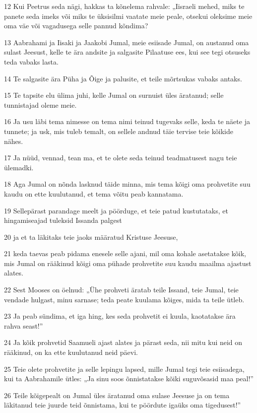 \par 12 Kui Peetrus seda nägi, hakkas ta kõnelema rahvale: „Iisraeli mehed, miks te panete seda imeks või miks te üksisilmi vaatate meie peale, otsekui oleksime meie oma väe või vagadusega selle pannud kõndima?
\par 13 Aabrahami ja Iisaki ja Jaakobi Jumal, meie esiisade Jumal, on austanud oma sulast Jeesust, kelle te ära andsite ja salgasite Pilaatuse ees, kui see tegi otsuseks teda vabaks lasta.
\par 14 Te salgasite ära Püha ja Õige ja palusite, et teile mõrtsukas vabaks antaks.
\par 15 Te tapsite elu ülima juhi, kelle Jumal on surnuist üles äratanud; selle tunnistajad oleme meie.
\par 16 Ja usu läbi tema nimesse on tema nimi teinud tugevaks selle, keda te näete ja tunnete; ja usk, mis tuleb temalt, on sellele andnud täie tervise teie kõikide nähes.
\par 17 Ja nüüd, vennad, tean ma, et te olete seda teinud teadmatusest nagu teie ülemadki.
\par 18 Aga Jumal on nõnda lasknud täide minna, mis tema kõigi oma prohvetite suu kaudu on ette kuulutanud, et tema võitu peab kannatama.
\par 19 Sellepärast parandage meelt ja pöörduge, et teie patud kustutataks, et hingamiseajad tuleksid Issanda palgest
\par 20 ja et ta läkitaks teie jaoks määratud Kristuse Jeesuse,
\par 21 keda taevas peab pidama enesele selle ajani, mil oma kohale asetatakse kõik, mis Jumal on rääkinud kõigi oma pühade prohvetite suu kaudu maailma ajastust alates.
\par 22 Sest Mooses on öelnud: „Ühe prohveti äratab teile Issand, teie Jumal, teie vendade hulgast, minu sarnase; teda peate kuulama kõiges, mida ta teile ütleb.
\par 23 Ja peab sündima, et iga hing, kes seda prohvetit ei kuula, kaotatakse ära rahva seast!”
\par 24 Ja kõik prohvetid Saamueli ajast alates ja pärast seda, nii mitu kui neid on rääkinud, on ka ette kuulutanud neid päevi.
\par 25 Teie olete prohvetite ja selle lepingu lapsed, mille Jumal tegi teie esiisadega, kui ta Aabrahamile ütles: „Ja sinu soos õnnistatakse kõiki suguvõsasid maa peal!”
\par 26 Teile kõigepealt on Jumal üles äratanud oma sulase Jeesuse ja on tema läkitanud teie juurde teid õnnistama, kui te pöördute igaüks oma tigedusest!”


